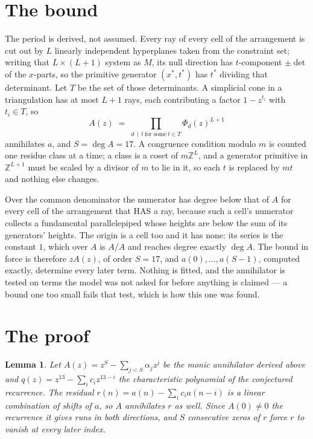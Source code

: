 \documentclass[11pt,a4paper]{article}
\theoremstyle{plain}
\newtheorem{lemma}[theorem]{Lemma}
\theoremstyle{definition}
\begin{document}
\section{The bound}

The period is derived, not assumed. Every ray of every cell of the arrangement is cut out by
$L$ linearly independent hyperplanes taken from the constraint set; writing that $L\times(L+1)$
system as $M$, its null direction has $t$-component $\pm\det$ of the $x$-parts, so the
primitive generator $(x^*,t^*)$ has $t^*$ dividing that determinant. Let $T$ be the set of
those determinants. A simplicial cone in a triangulation has at most $L+1$ rays, each
contributing a factor $1-z^{t_i}$ with $t_i\in T$, so
\[
A(z)\;=\;\prod_{d\,\mid\,t\ \text{for some}\ t\in T}\Phi_d(z)^{L+1}
\]
annihilates $a$, and $S=\deg A=17$. A congruence condition modulo $m$ is counted one residue
class at a time; a class is a coset of $m\mathbb{Z}^L$, and a generator primitive in
$\mathbb{Z}^{L+1}$ must be scaled by a divisor of $m$ to lie in it, so each $t$ is replaced
by $mt$ and nothing else changes.

Over the common denominator the numerator has degree below that of $A$ for every cell of the
arrangement that HAS a ray, because such a cell's numerator collects a fundamental
parallelepiped whose heights are below the sum of its generators' heights. The origin is a cell
too and it has none: its series is the constant $1$, which over $A$ is $A/A$ and reaches degree
exactly $\deg A$. The bound in force is therefore $zA(z)$, of order $S=17$, and
$a(0),\dots,a(S-1)$, computed exactly, determine every later term. Nothing is fitted, and the
annihilator is tested on terms the model was not asked for before anything is claimed --- a
bound one too small fails that test, which is how this one was found.

\section{The proof}

\begin{lemma}\label{lem:crit}
Let $A(z)=z^S-\sum_{j<S}\alpha_jz^{j}$ be the monic annihilator derived above and
$q(z)=z^{13}-\sum_ic_iz^{13-i}$ the characteristic polynomial of the conjectured
recurrence. The residual $r(n)=a(n)-\sum_ic_ia(n-i)$ is a linear combination of shifts of $a$,
so $A$ annihilates $r$ as well. Since $A(0)\ne0$ the recurrence it gives runs in both
directions, and $S$ consecutive zeros of $r$ force $r$ to vanish at every later index.
\end{lemma}
\end{document}
